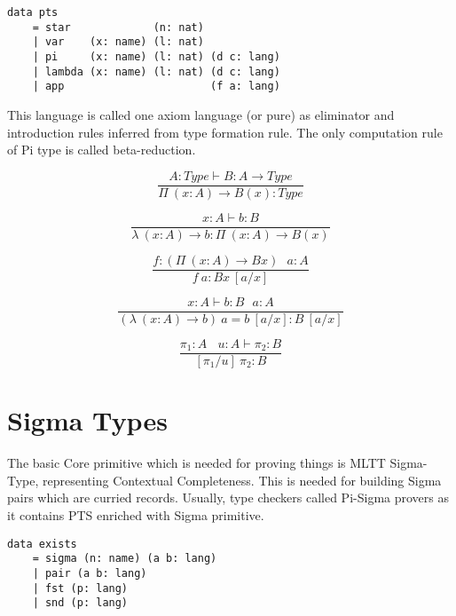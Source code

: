 \begin{lstlisting}[mathescape=true]
data pts
    = star             (n: nat)
    | var    (x: name) (l: nat)
    | pi     (x: name) (l: nat) (d c: lang)
    | lambda (x: name) (l: nat) (d c: lang)
    | app                       (f a: lang)
\end{lstlisting}

This language is called one axiom language (or pure) as eliminator
and introduction rules inferred from type formation rule.
The only computation rule of Pi type is called beta-reduction.

\begin{equation}
\tag{$\Pi$-formation}
\dfrac
{A : Type \vdash B : A \rightarrow Type}
{\Pi\ (x:A) \rightarrow B(x) : Type}
\end{equation}

\begin{equation}
\tag{$\lambda$-intro}
\dfrac
{x:A \vdash b : B}
{\lambda\ (x:A) \rightarrow b : \Pi\ (x:A) \rightarrow B(x) }
\end{equation}

\begin{equation}
\tag{$App$-elimination}
\dfrac
{f: (\Pi\ (x:A) \rightarrow B x)\ \ \ a: A}
{f\ a : B x\ [a/x]}
\end{equation}

\begin{equation}
\tag{$\beta$-computation}
\dfrac
{x:A \vdash b: B\ \ \ a:A}
{(\lambda\ (x:A) \rightarrow b)\ a = b\ [a/x] : B\ [a/x]}
\end{equation}

\begin{equation}
\tag{subst}
\dfrac
{\pi_1 : A\ \ \ \ u:A \vdash \pi_2 : B}
{[\pi_1/u]\ \pi_2 : B}
\end{equation}

\section{Sigma Types}

The basic Core primitive which is needed for proving things
is MLTT Sigma-Type, representing Contextual Completeness.
This is needed for building Sigma pairs which are curried
records. Usually, type checkers called Pi-Sigma provers
as it contains PTS enriched with Sigma primitive.

\begin{lstlisting}[mathescape=true]
data exists
    = sigma (n: name) (a b: lang)
    | pair (a b: lang)
    | fst (p: lang)
    | snd (p: lang)
\end{lstlisting}

